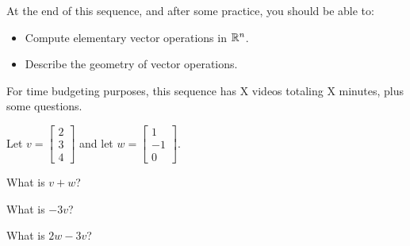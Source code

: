







At the end of this sequence, and after some practice, you should be able to:

\begin{itemize}
\item Compute elementary vector operations in $\mathbb R^n$.  
\item Describe the geometry of vector operations.
\end{itemize}


For time budgeting purposes, this sequence has X videos totaling X minutes, 
plus some questions.  




\endedxtext

\endedxvertical









Let $v = \left[\begin{array}{c} 2 \\ 3  \\ 4 \end{array} \right]$ and let 
$w = \left[\begin{array}{c} 1 \\ -1  \\ 0 \end{array} \right].$





What is $v+w$?  



What is $-3v$?  



What is $2w-3v$?  





